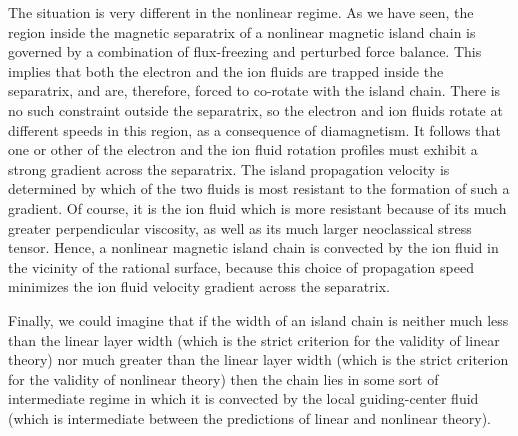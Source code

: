 \documentclass[12pt,prb,aps]{revtex4-1}
\begin{document}
The situation is very different in the nonlinear regime. 
As we have seen, the region inside the magnetic separatrix of a nonlinear magnetic island chain is governed by a combination of flux-freezing and perturbed force balance.
This implies that both the electron and the ion fluids are trapped inside the separatrix, and are, therefore,  forced to co-rotate with the island chain. There
is no such constraint outside the separatrix, so the electron and ion fluids rotate at different speeds in this region,
as a consequence of diamagnetism.  It follows that one or other of the electron and the ion fluid rotation profiles must exhibit a strong gradient across
the separatrix. The island propagation velocity is determined by which of the two fluids is most resistant to the formation of such a gradient. 
Of course, it is the ion fluid which is more resistant because of its much greater perpendicular viscosity,\cite{nl1,wat} as well as its much larger 
neoclassical stress tensor.\cite{nl2} Hence, a nonlinear magnetic island chain is convected by the ion fluid in the vicinity of the rational
surface, because this choice of propagation speed minimizes the ion fluid velocity gradient across the separatrix.

Finally, we could imagine that if the width of an island chain is neither much less than the linear layer width (which is the strict
criterion for the validity of linear theory) nor much greater than the linear layer width (which is the strict criterion for
the validity of nonlinear theory) then the chain lies in some sort of intermediate regime in which it is
convected by the local guiding-center fluid (which is intermediate between the predictions of linear and nonlinear theory). 

\newpage
\end{document}
